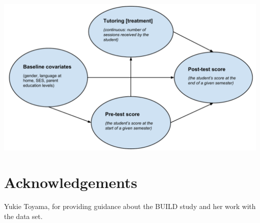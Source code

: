 \documentclass[a0,landscape]{a0poster}
\begin{document}
\begin{multicols}{3}
\color{DarkSlateGray} %

\begin{center}\vspace{1cm}
\includegraphics[width=0.8\linewidth]{LongitData-DAG.pdf}
\end{center}\vspace{-1cm}


\section*{Acknowledgements}

Yukie Toyama, for providing guidance about the BUILD study and her work with the data set.


\end{multicols}
\end{document}

